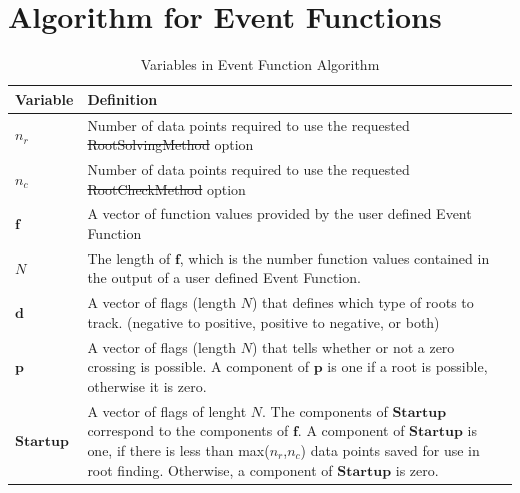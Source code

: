 \section{Algorithm for Event Functions }


\begin{table}[htb]
\caption{ Variables in Event Function Algorithm}
\begin{tabular}{p{.5 in} p{2.5 in}}
   \hline
   Variable & Definition\\
   \hline \hline
    $n_r$     & Number of data points required to use the requested \st{RootSolvingMethod} option \\
    $n_c$     & Number of data points required to use the requested \st{RootCheckMethod} option\\
    $\mathbf{f}$  & A vector of function values provided by the user
    defined Event Function\\
    $N$           &  The length of $\mathbf{f}$, which is the number
    function values contained in  the output of a user defined Event
    Function.\\
    $\mathbf{d}$   &  A vector of flags (length $N$) that defines which
    type of roots to track.  (negative to positive, positive to
    negative, or both)\\
    $\mathbf{p}$   &  A vector of flags (length $N$) that tells whether or not a
    zero crossing is possible.  A component of $\mathbf{p}$ is one
    if a root is possible, otherwise it is zero.\\
    $\mathbf{Startup}$ & A vector of flags of lenght $N$.  The components of $\mathbf{Startup}$ correspond to the components of $\mathbf{f}$.
                        A component of $\mathbf{Startup}$ is one, if there is
                       less than max($n_r$,$n_c$) data points saved for use in root finding.
                        Otherwise, a component of $\mathbf{Startup}$ is zero.\\
   \hline
 \end{tabular}
 \label{Table:VariablesinEventFunctionChart}
\end{table}



